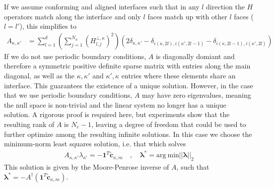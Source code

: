\documentclass[12pt,a4paper]{article}
\newcommand{\norm}[1]{\left\vert \left\vert #1 \right\vert \right\vert} %
\begin{document}
If we assume conforming and aligned interfaces such that in any $l$ direction the $H$ operators match along the interface and only $l$ faces match up with other $l$ faces ($l=l'$), this simplifies to
\begin{align*}
A_{\kappa, \kappa'} &=  \sum_{l=1}^d \left( \sum_{j=1}^{N_n} \left( H^{\bot,\kappa}_{l,j} \right)^2 \right)  \left( 2 \delta_{\kappa,\kappa'}  - \delta_{i(\kappa,2l),i(\kappa',2l-1)} - \delta_{i(\kappa,2l-1),i(\kappa',2l)}   \right)
\end{align*}
If we do not use periodic boundary conditions, $A$ is diagonally domiant and therefore a symmetric positive definite sparse matrix with entries along the main diagonal, as well as the $\kappa,\kappa'$ and $\kappa',\kappa$ entries where these elements share an interface. This guarantees the existence of a unique solution. However, in the case that we use periodic boundary conditions, $A$ may have zero eigenvalues, meaning the null space is non-trivial and the linear system no longer has a unique solution. A rigorous proof is required here, but experiments show that the resulting rank of $A$ is $N_e - 1$, leaving a degree of freedom that could be used to further optimize among the resulting infinite solutions. In this case we choose the minimum-norm least squares solution, i.e. that which solves
\begin{align*}
A_{\kappa, \kappa'} \lambda_{\kappa'} = - \bm{1}^T \tilde{\bm{c}}_{\kappa, m} \quad , \quad \bm{\lambda}^* = \text{arg} \ \text{min} \norm{\bm{\lambda}}_2
\end{align*}
This solution is given by the Moore-Penrose inverse of $A$, such that $ \bm{\lambda}^* = - A^\dagger \left( \bm{1}^T \tilde{\bm{c}}_{\kappa, m} \right)$. 
\end{document}
